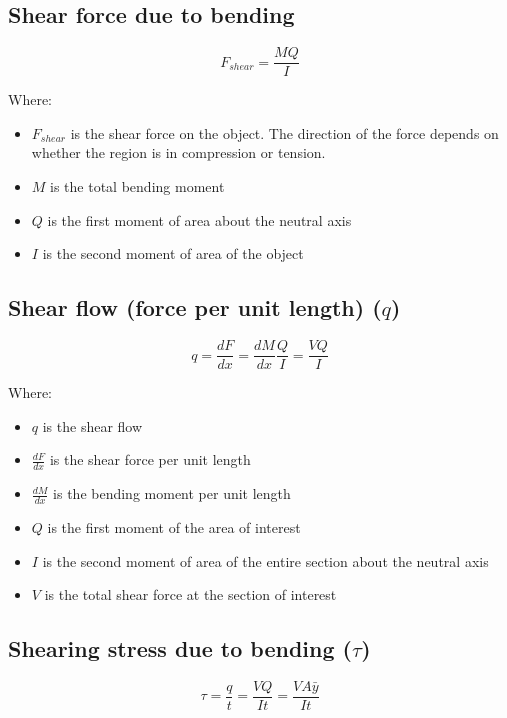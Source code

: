 \documentclass[11pt]{article}
\begin{document}
\subsection{Shear force due to bending}
\label{sec:org1ea39cb}
\[F_{shear} = \frac{MQ}{I}\]

Where:
\begin{itemize}
\item \(F_{shear}\) is the shear force on the object. The direction of the force depends on whether the region is in compression or tension.
\item \(M\) is the total bending moment
\item \(Q\) is the first moment of area about the neutral axis
\item \(I\) is the second moment of area of the object
\end{itemize}
\subsection{Shear flow (force per unit length) (\(q\))}
\label{sec:org6ffe3b9}
\[q = \frac{dF}{dx} = \frac{dM}{dx} \frac{Q}{I} = \frac{VQ}{I}\]

Where:
\begin{itemize}
\item \(q\) is the shear flow
\item \(\frac{dF}{dx}\) is the shear force per unit length
\item \(\frac{dM}{dx}\) is the bending moment per unit length
\item \(Q\) is the first moment of the area of interest
\item \(I\) is the second moment of area of the entire section about the neutral axis
\item \(V\) is the total shear force at the section of interest
\end{itemize}

\newpage
\subsection{Shearing stress due to bending (\(\tau\))}
\label{sec:org236b7a4}
\[\tau = \frac{q}{t} = \frac{VQ}{It} = \frac{VA \bar{y}}{It}\]
\end{document}
